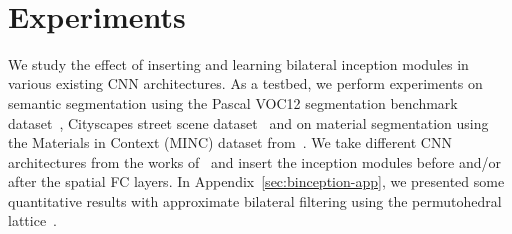\begin{figure*}[t]
  \small
  \centering

  \\[-2ex]
  \setcounter{subfigure}{0}
  \label{fig:semantic_visuals}
\end{figure*}



\section{Experiments}

We study the effect of inserting and learning bilateral inception modules
in various existing CNN architectures.
As a testbed, we perform experiments on semantic segmentation
using the Pascal VOC12 segmentation
benchmark dataset~\cite{voc2012segmentation}, Cityscapes street scene dataset~\cite{Cordts2015Cvprw}
and on material segmentation using the Materials in Context (MINC)
dataset from~\cite{bell2015minc}. We take different CNN architectures from the works
of~\cite{chen2014semantic,zheng2015conditional,bell2015minc} and insert the
inception modules before and/or after the spatial FC layers. In Appendix~\ref{sec:binception-app},
we presented some quantitative results with approximate bilateral filtering using the permutohedral
lattice~\cite{adams2010fast}.

